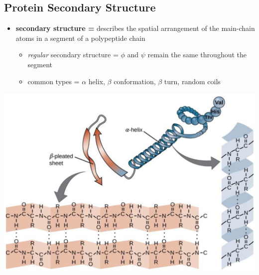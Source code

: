 \documentclass[10pt]{article}
\begin{document}
\subsection*{Protein Secondary Structure}
\begin{itemize}
    \item \textbf{secondary structure =} describes the spatial arrangement of the main-chain atoms in a segment of a polypeptide chain
    \begin{itemize}
        \item \textit{regular} secondary structure = $\phi$ and $\psi$ remain the same throughout the segment
        \item common types = $\alpha$ helix, $\beta$ conformation, $\beta$ turn, random coils
    \end{itemize}
\end{itemize}
\begin{center}
    \includegraphics*[width=\textwidth]{L2_1.png}
\end{center}
\end{document}
